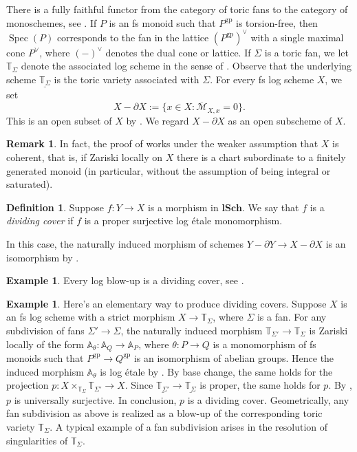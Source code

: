 \documentclass[11pt, a4paper]{amsart}
\theoremstyle{definition}
\newtheorem{df}[thm]{Definition}
\newtheorem{rmk}[thm]{Remark}
\newtheorem{exm}[thm]{Example}
\numberwithin{equation}{subsection}
\newcommand{\A}{\mathbb{A}}
\newcommand{\T}{\mathbb{T}}
\newcommand{\lSch}{\mathbf{lSch}}
\providecommand{\Spec}[1]{\operatorname{Spec}(#1)} 	%
\newcommand{\ol}{\overline}
\renewcommand{\ul}{\underline}
\newcommand{\gp}{{\mathrm{gp}}}
\newcommand{\cM}{\mathcal{M}}
\begin{document}
There is a fully faithful functor from the category of toric fans to the category of monoschemes, 
see \cite[Theorem II.1.9.3]{Ogu}.
If $P$ is an fs monoid such that $P^\gp$ is torsion-free, then $\Spec{P}$ corresponds to the fan in the lattice $(P^\gp)^\vee$ with a single maximal cone $P^\vee$, 
where $(-)^\vee$ denotes the dual cone or lattice.
If $\Sigma$ is a toric fan, 
we let $\T_\Sigma$ denote the associated log scheme in the sense of \cite[p.\ 276, \S III.1.2]{Ogu}.
Observe that the underlying scheme $\ul{\T_{\Sigma}}$ is the toric variety associated with $\Sigma$.
For every fs log scheme $X$,
we set
\[
X-\partial X
:=
\{x\in X:
\ol{\cM}_{X,x}=0\}.
\]
This is an open subset of $X$ by \cite[Proposition III.1.2.8]{Ogu}.
We regard $X-\partial X$ as an open subscheme of $X$.
\begin{rmk}
In fact, the proof of \cite[Proposition III.1.2.8]{Ogu} works under the weaker assumption that $X$ is coherent, that is, if Zariski locally on $X$ there is a chart subordinate to a finitely generated monoid (in particular, without the assumption of being integral or saturated).
\end{rmk}

\begin{df}\label{df:dividing_cover}
Suppose $f\colon Y\to X$ is a morphism in $\lSch$.
We say that $f$ is a \emph{dividing cover}  if $f$ is a proper surjective log  \'etale monomorphism.

In this case, the naturally induced morphism of schemes $Y-\partial Y\to X-\partial X$ is an isomorphism by 
\cite[Remark 3.1.7(1)]{logDM}.
\end{df}

\begin{exm}
\label{logtop.8}
Every log blow-up \cite[Definition III.2.6.2]{Ogu} is a dividing cover, see \cite[Example A.11.1]{logDM}.
\end{exm}

\begin{exm}
\label{logtop.8bis} Here's an elementary way to produce dividing covers.
Suppose $X$ is an fs log scheme with a strict morphism $X\to \T_\Sigma$, 
where $\Sigma$ is a fan.
For any subdivision of fans $\Sigma'\to \Sigma$, 
the naturally induced morphism $\T_{\Sigma'}\to \T_{\Sigma}$ is Zariski locally of the form 
$\A_{\theta}\colon \A_Q\to \A_P$, 
where $\theta\colon P\to Q$ is a monomorphism of fs monoids such that $P^\gp\to Q^\gp$ is an isomorphism of 
abelian groups.
Hence the induced morphism $\mathbb{A}_{\theta}$ is log \'etale by \cite[Corollary IV.3.1.10]{Ogu}. By base change, the same holds for the projection $p\colon X\times_{\T_\Sigma}\T_{\Sigma'}\to X$.
Since $\ul{\T_{\Sigma'}}\to \ul{\T_{\Sigma}}$ is proper, the same holds for  $p$.
By \cite[Lemma A.11.4]{logDM}, $p$ is universally surjective.
In conclusion, $p$ is a dividing cover. 
Geometrically, any fan subdivision as above is realized as a blow-up of the corresponding toric variety $\mathbb{T}_\Sigma$. A typical example of a fan subdivision arises in the resolution of singularities of $\mathbb{T}_\Sigma$. 
\end{exm}
\end{document}
